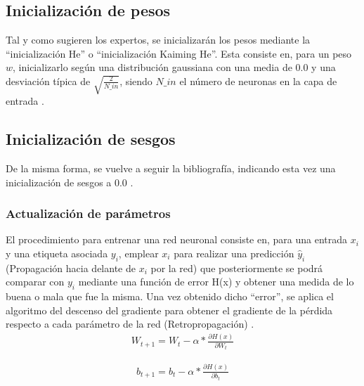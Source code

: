 \subsection{Inicialización de pesos}
Tal y como sugieren los expertos, se inicializarán los pesos mediante la ``inicialización He'' o ``inicialización Kaiming He''. Esta consiste en, para un peso $w$, inicializarlo según una distribución gaussiana con una media de 0.0 y una desviación típica de $\sqrt{\frac{2}{N\_in}}$, siendo $N\_in$ el número de neuronas en la capa de entrada
\cite{ini_He} \cite{ini_He_2} \cite{ini_He_code} \cite{importancia_ReLU} \cite{importancia_ReLU_2}.

\subsection{Inicialización de sesgos}

De la misma forma, se vuelve a seguir la bibliografía, indicando esta vez una inicialización de sesgos a 0.0 \cite{ini_bias} \cite{ini_bias_2}.

\subsubsection{Actualización de parámetros}
El procedimiento para entrenar una red neuronal consiste en, para una entrada $x_i$ y una etiqueta asociada $y_i$, emplear $x_i$ para realizar una predicción $\hat{y}_i$ (Propagación hacia delante de $x_i$ por la red) que posteriormente se podrá comparar con $y_i$ mediante una función de error H(x) y obtener una medida de lo buena o mala que fue la misma. Una vez obtenido dicho ``error'', se aplica el algoritmo del descenso del gradiente para obtener el gradiente de la pérdida respecto a cada parámetro de la red (Retropropagación) \cite{Cross_entropy}. \\

\begin{gather}
	W_{t+1} = W_{t} - \alpha * \frac{\partial H(x)}{\partial W_{t}} 
	\label{act_pesos}
\end{gather}

\begin{gather}
	b_{t+1} = b_{t} - \alpha * \frac{\partial H(x)}{\partial b_{t}}
	\label{act_bias}
\end{gather}


